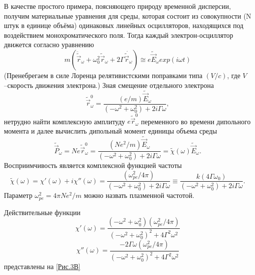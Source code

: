 \documentclass[a4paper]{article}
\begin{document}
	В качестве простого примера, поясняющего природу временной дисперсии, получим материальные уравнения для среды, которая состоит из совокупности (N штук в единице объёма) одинаковых линейных осцилляторов, находящихся под воздействием монохроматического поля. Тогда каждый электрон-осциллятор движется согласно уравнению 
	\begin{equation}
		m\left(\ddot{\tilde{\vec{r}}}_{\omega}+\omega_{0}^{2}\tilde{\vec{r}}_{\omega}+2\Gamma\dot{\tilde{\vec{r}}_{\omega}}\right)\cong e\tilde{\vec{E}}_{\omega} exp(i\omega t)
	\end{equation}
	(Пренебрегаем в силе Лоренца релятивистскими поправками типа $(V/c)$, где $V$ –скорость движения электрона.) Зная смещение отдельного электрона 
	\begin{equation}
		\tilde{\vec{r}}^{0}_{\omega}=\frac{(e/m)\tilde{\vec{E}}_{\omega}}{(-\omega^{2}+\omega^{2}_{0})+2i\Gamma\omega},
	\end{equation}
	нетрудно найти комплексную амплитуду $e	\tilde{\vec{r}}^{0}_{\omega}$  переменного во времени дипольного момента  и далее вычислить дипольный момент единицы объема среды 
	\begin{equation}
		\tilde{\vec{P}}_{\omega}=Ne	\tilde{\vec{r}}^{0}_{\omega}=\frac{\left(Ne^{2}/m\right)\tilde{\vec{E}}_{\omega}}{(-\omega^{2}+\omega^{2}_{0})+2i\Gamma\omega}=\tilde{\chi}(\omega)\tilde{\vec{E}}_{\omega}.
	\end{equation}
	Восприимчивость является комплексной функцией частоты
	\begin{equation}
		\tilde{\chi}(\omega)=\chi'(\omega)+i\chi''(\omega)=\frac{(\omega_{pe}^{2}/4\pi)}{(-\omega^{2}+\omega_{0}^{2})+2i\Gamma\omega}\equiv\frac{k(4\Gamma\omega_{0})}{(-\omega^{2}+\omega_{0}^{2})+2i\Gamma\omega}.\label{22}
	\end{equation}
	Параметр $\omega_{pe}^{2}=4\pi Ne^{2}/m$ можно назвать плазменной частотой.
	 
	\begin{figure}[h]
		\label{Рис.3В}
	\end{figure}
	Действительные функции 
	\begin{equation}
		\chi'(\omega)=\frac{(-\omega^{2}+\omega_{0}^{2})(\omega_{pe}^{2}/4\pi)}{(-\omega^{2}+\omega_{0}^{2})^{2}+4\Gamma^{2}\omega^{2}}\tag{22'}
	\end{equation}
	\begin{equation}
		\chi''(\omega)=\frac{-2\Gamma\omega(\omega_{pe}^{2}/4\pi)}{(-\omega^{2}+\omega_{0}^{2})^{2}+4\Gamma^{2}\omega^{2}}
		\tag{22''}
	\end{equation}
	представлены на \eqref{Рис.3В}
\end{document}
